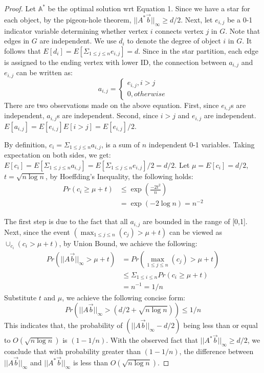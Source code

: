 \begin{proof}
Let $\mathbb{A}^*$ be the optimal solution wrt Equation 1. Since we have a star
for each object, by the pigeon-hole theorem, $||A^*\vec{b}||_\infty \geq d/2$.
Next, let $e_{i,j}$ be a 0-1 indicator variable determining whether vertex $i$ connects vertex $j$
in $G$. Note that edges in $G$ are independent. We use $d_i$ 
to denote the degree of object $i$ in $G$.  It follows that $E[d_i]=E[\Sigma_{1\leq j \leq n}e_{i,j}]=d$.
Since in the star partition, each edge is assigned to the ending vertex
with lower ID, the connection between $a_{i,j}$ and $e_{i,j}$ can be written as:
\begin{equation*}
a_{i,j} = \begin{cases}
			e_{i,j}, i>j \\
			0, otherwise
		  \end{cases}  
\end{equation*}
There are two observations made on the above equation. First, since $e_{i,j}$s are independent,
$a_{i,j}$s are independent. Second, since $i>j$ and $e_{i,j}$ are independent. 
$E[a_{i,j}] = E[e_{i,j}]E[i>j]= E[e_{i,j}]/2$.

By definition, $c_i = \Sigma_{1\leq j \leq n} a_{i,j}$, 
is a sum of $n$ independent 0-1 variables. Taking expectation on both sides, 
we get: $E[c_i] = E[\Sigma_{1\leq j \leq n} a_{i,j}]=E[\Sigma_{1\leq j \leq n} e_{i,j}]/2 = d/2$. Let $\mu =E[c_i] = d/2$, 
$t = \sqrt{n\log n}$, by Hoeffding's Inequality, the following holds:
\begin{equation*}
\begin{split}
	Pr(c_i \geq \mu + t) 
						&\leq \exp(\frac{-2t^2}{n}) \\
						&= \exp(-2\log n) = n^{-2}
\end{split}
\end{equation*}

The first step is due to the fact that all $a_{i,j}$ are bounded in the range of [0,1]. 
Next, since the event $(\max_{1\leq j \leq n}(c_j) > \mu + t)$ can be viewed as
$\cup_{c_i} (c_i > \mu + t )$, by Union Bound, we achieve the following:
\begin{equation*}
\begin{split}
	Pr(||A\vec{b}||_\infty > \mu + t) &=Pr(\max_{1\leq j \leq n}(c_j) > \mu + t)  \\
		&\leq \Sigma_{1 \leq i \leq n} Pr(c_i \geq \mu + t) \\
		& = n^{-1} = 1/n
\end{split}
\end{equation*}
Substitute $t$ and $\mu$, we achieve the following concise form:
\begin{equation*}
	Pr(||A\vec{b}||_\infty > (d/2 + \sqrt{n\log n})) \leq 1/n
\end{equation*}
This indicates that, the probability of $(||A\vec{b}||_\infty-d/2)$ being less than or equal to $ O(\sqrt{n\log n})$ is $(1-1/n)$. With the observed fact that $||A^*\vec{b}||_\infty \geq d/2$, we conclude that
with probability greater than $(1-1/n)$, 
the difference between $||A\vec{b}||_\infty$ and $||A^*\vec{b}||_\infty$ is less than $O(\sqrt{n\log n})$.
\end{proof}

